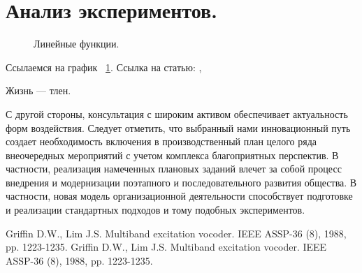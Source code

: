 \documentclass[a4paper,article,14pt]{extarticle}
\begin{document}
    \section{Анализ экспериментов.}
    \begin{figure}[ht]
        \begin{center}

            \caption{
                \label{graph-fig}
                Линейные функции.}
        \end {center}
    \end {figure}
    Ссылаемся на график ~\ref{graph-fig}.
    Ссылка на статью: \cite{voc}, \cite{vo2}

    Жизнь --- тлен.
    \pagebreak


    С другой стороны, консультация с широким активом обеспечивает актуальность форм воздействия. Следует отметить, что выбранный нами инновационный путь создает необходимость включения в производственный план целого ряда внеочередных мероприятий с учетом комплекса благоприятных перспектив. В частности, реализация намеченных плановых заданий влечет за собой процесс внедрения и модернизации поэтапного и последовательного развития общества. В частности, новая модель организационной деятельности способствует подготовке и реализации стандартных подходов и тому подобных экспериментов.

    \begin{thebibliography}{1}
         Griffin D.W., Lim J.S. \flqq Multiband excitation vocoder\frqq. IEEE ASSP-36 (8), 1988, pp. 1223-1235.
         Griffin D.W., Lim J.S. \flqq Multiband excitation vocoder\frqq. IEEE ASSP-36 (8), 1988, pp. 1223-1235.
    \end{thebibliography}
\end{document}
